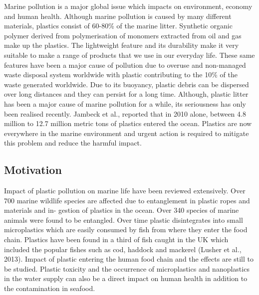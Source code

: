 \documentclass[10pt]{article}\usepackage[]{graphicx}\usepackage[]{color}
\begin{document}
Marine pollution is a major global issue which impacts on environment, economy and human health. Although marine pollution is caused by many different materials, plastics consist of 60-80\% of the marine litter. Synthetic organic polymer derived from polymerisation of monomers extracted from oil and gas make up the plastics.\cite{DERRAIK2002} \cite{RIOS2007} The lightweight feature and its durability make it very suitable to make a range of products that we use in our everyday life.\cite{BARNES2009} \cite{SIVAN2011} These same features have been a major cause of pollution due to overuse and non-managed waste disposal system worldwide with plastic contributing to the 10\% of the waste generated worldwide.\cite{BARNES2009} Due to its buoyancy, plastic debris can be dispersed over long distances and they can persist for a long time. Although, plastic litter has been a major cause of marine pollution for a while, its seriousness has only been realised recently. Jambeck et al.,\cite{JAMBECK2015} reported that in 2010 alone, between 4.8 million to 12.7 million metric tons of plastics entered the ocean. Plastics are now everywhere in the marine environment and urgent action is required to mitigate this problem and reduce the harmful impact.\cite{RIOS2007} \cite{ROCHMAN2015}


\subsection{Motivation}\label{mot}

Impact of plastic pollution on marine life have been reviewed extensively. \cite{GALL2015} \cite{KUHN2015} \cite{RYAN2015} \cite{WILLIAMS2019} Over 700 marine wildlife species are affected due to entanglement in plastic ropes and materials and in- gestion of plastics in the ocean.\cite{GALL2015} Over 340 species of marine animals were found to be entangled. \cite{KUHN2015} Over time plastic disintegrates into small microplastics which are easily consumed by fish from where they enter the food chain. Plastics have been found in a third of fish caught in the UK which included the popular fishes such as cod, haddock and mackerel (Lusher et al., 2013). Impact of plastic entering the human food chain and the effects are still to be studied. Plastic toxicity and the occurrence of microplastics and nanoplastics in the water supply can also be a direct impact on human health in addition to the contamination in seafood.\cite{ROCHMAN2015} \cite{MARKIC2020} \\
\end{document}

